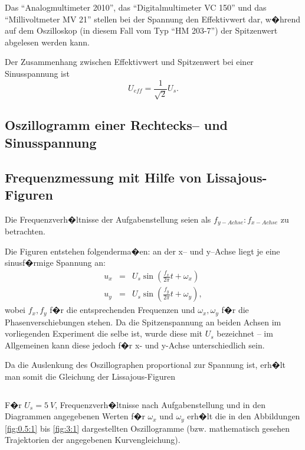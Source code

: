 \documentclass[10pt]{scrartcl}
\begin{document}
Das "`Analogmultimeter 2010"', das "`Digitalmultimeter VC 150"' und das "`Millivoltmeter MV 21"' stellen bei der Spannung den Effektivwert dar, w�hrend auf dem Oszilloskop (in diesem Fall vom Typ "`HM 203-7"') der Spitzenwert abgelesen werden kann.

Der Zusammenhang zwischen Effektivwert und Spitzenwert bei einer Sinusspannung ist
\begin{displaymath}
U_{eff} = \frac{1}{\sqrt{2}} U_s.
\end{displaymath}

\subsection{Oszillogramm einer Rechtecks-- und Sinusspannung}

\subsection{Frequenzmessung mit Hilfe von Lissajous-Figuren}

\label{abschnitt:liss}

Die Frequenzverh�ltnisse der Aufgabenstellung seien als $f_{y-Achse} : f_{x-Achse}$ zu betrachten.

Die Figuren entstehen folgenderma�en: an der x-- und y--Achse liegt je eine sinusf�rmige Spannung an:
\begin{eqnarray*}
u_x & = & U_s \sin (\frac{f_x}{2 \pi} t+\omega_x) \\
u_y & = & U_s \sin (\frac{f_y}{2 \pi} t+\omega_y),
\end{eqnarray*}
wobei $f_x, f_y$ f�r die entsprechenden Frequenzen und $\omega_x, \omega_y$ f�r die Phasenverschiebungen stehen. Da die Spitzenspannung an beiden Achsen im vorliegenden Experiment die selbe ist, wurde diese mit $U_s$ bezeichnet -- im Allgemeinen kann diese jedoch f�r x- und y-Achse unterschiedlich sein.

Da die Auslenkung des Oszillographen proportional zur Spannung ist, erh�lt man somit die Gleichung der Lissajous-Figuren

\begin{displaymath}
\end{displaymath}

F�r $U_s=5~V$, Frequenzverh�ltnisse nach Aufgabenstellung und in den Diagrammen angegebenen Werten f�r $\omega_x$ und $\omega_y$ erh�lt die in den Abbildungen \ref{fig:0.5:1} bis \ref{fig:3:1} dargestellten Oszillogramme (bzw. mathematisch gesehen Trajektorien der angegebenen Kurvengleichung).
\end{document}
